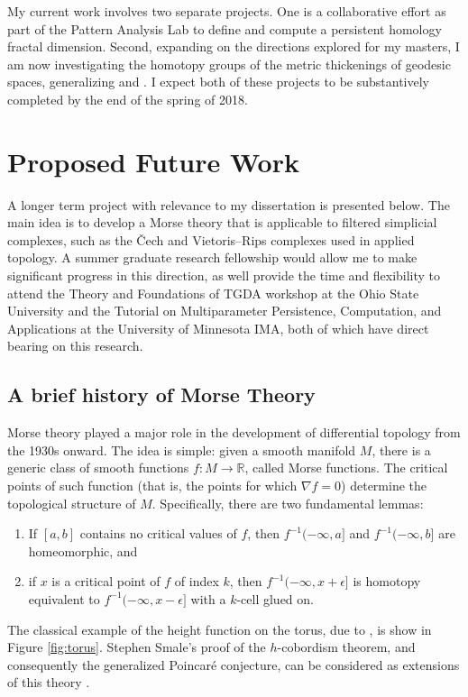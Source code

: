 \documentclass[11pt]{amsart}
\newcommand{\R}{\mathbb{R}}
\begin{document}
My current work involves two separate projects.
One is a collaborative effort as part of the Pattern Analysis Lab to define and compute a persistent homology fractal dimension.
Second, expanding on the directions explored for my masters, I am now investigating the homotopy groups of the metric thickenings of geodesic spaces, generalizing \cite{GasparovicCompleteCharacterization1Dimensional2017} and \cite{Virk1DimensionalIntrinsicPersistence2017}. 
I expect both of these projects to be substantively completed by the end of the spring of 2018.

\section{Proposed Future Work}

A longer term project with relevance to my dissertation is presented below.
The main idea is to develop a Morse theory that is applicable to filtered simplicial complexes, such as the \v{C}ech and Vietoris--Rips complexes used in applied topology. 
A summer graduate research fellowship would allow me to make significant progress in this direction, as well provide the time and flexibility to attend the Theory and Foundations of TGDA workshop at the Ohio State University and the Tutorial on Multiparameter Persistence, Computation, and Applications at the University of Minnesota IMA, both of which have direct bearing on this research.

\subsection{A brief history of Morse Theory}

Morse theory played a major role in the development of differential topology from the 1930s onward.
The idea is simple: given a smooth manifold $M$, there is a generic class of smooth functions $f \colon M \to \R$, called Morse functions.
The critical points of such function (that is, the points for which $\nabla f = 0$) determine the topological structure of $M$.  
Specifically, there are two fundamental lemmas:
\begin{enumerate}[label=(\alph*)]
\item If $[a,b]$ contains no critical values of $f$, then $f^{-1}(-\infty,a]$ and $f^{-1}(-\infty,b]$ are homeomorphic, and
\item if $x$ is a critical point of $f$ of index $k$, then $f^{-1}(-\infty,x+\epsilon]$ is homotopy equivalent to $f^{-1}(-\infty,x-\epsilon]$ with a $k$-cell glued on.
\end{enumerate}
The classical example of the height function on the torus, due to \cite{MilnorMorseTheory1963}, is show in Figure \ref{fig:torus}.
Stephen Smale's proof of the $h$-cobordism theorem, and consequently the generalized Poincar\'{e} conjecture, can be considered as extensions of this theory \cite{MilnorLectureshCobordismTheorem1965}.
\end{document}
